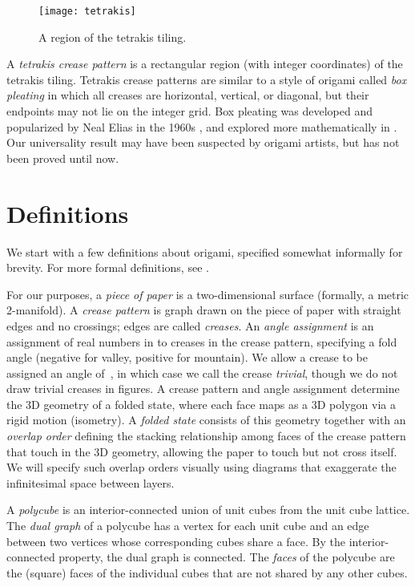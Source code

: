 \documentclass[11pt]{article}
\newcommand{\figlab}[1]{\label{fig:#1}}
\begin{document}
\begin{figure}
  \centering
  \texttt{[image: tetrakis]}
  \caption{A  region of the tetrakis tiling.}
  \figlab{tetrakis}
\end{figure}

A \emph{tetrakis crease pattern} is a rectangular region (with integer
coordinates) of the tetrakis tiling.
Tetrakis crease patterns are similar to a style of origami
called \emph{box pleating} in which all creases are horizontal,
vertical, or diagonal, but their endpoints may not lie on the integer grid.
Box pleating was developed and popularized by Neal Elias in the 1960s
\cite{Kirschenbaum-Elias}, and explored more mathematically in
\cite{Lang-2003-secrets}.
Our universality result may have been suspected by origami artists,
but has not been proved until now.


\section{Definitions}

We start with a few definitions about origami,
specified somewhat informally for brevity.
For more formal definitions, see \cite[ch.~11]{Demaine-O'Rourke-2007}.

For our purposes, a \emph{piece of paper} is a two-dimensional surface
(formally, a metric 2-manifold).
A \emph{crease pattern} is graph drawn on the piece of paper
with straight edges and no crossings; edges are called \emph{creases}.
An \emph{angle assignment} is an assignment of real numbers in
 to creases in the crease pattern,
specifying a fold angle (negative for valley, positive for mountain).
We allow a crease to be assigned an angle of~,
in which case we call the crease \emph{trivial},
though we do not draw trivial creases in figures.
A crease pattern and angle assignment determine the 3D geometry of a folded
state, where each face maps as a 3D polygon via a rigid motion (isometry).
A \emph{folded state} consists of this geometry together with an
\emph{overlap order} defining the stacking relationship among faces of the
crease pattern that touch in the 3D geometry, allowing the paper to touch
but not cross itself.
We will specify such overlap orders visually using diagrams
that exaggerate the infinitesimal space between layers.

A \emph{polycube} is an interior-connected union of unit cubes from the
unit cube lattice.  The \emph{dual graph} of a polycube has a vertex
for each unit cube and an edge between two vertices whose corresponding
cubes share a face.
By the interior-connected property, the dual graph is connected.
The \emph{faces} of the polycube are the (square) faces of the individual cubes
that are not shared by any other cubes.
\end{document}
